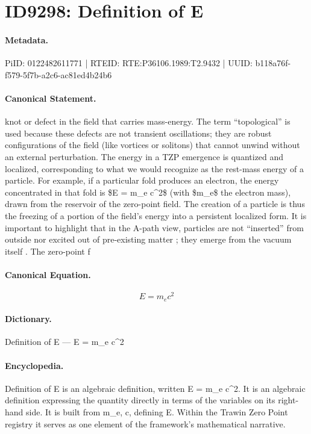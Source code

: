 \section*{ID9298: Definition of E}
\paragraph{Metadata.}
PiID: 0122482611771 | RTEID: RTE:P36106.1989:T2.9432 | UUID: b118a76f-f579-5f7b-a2c6-ac81ed4b24b6

\paragraph{Canonical Statement.}
knot or defect in the field that carries mass-energy. The term “topological” is used because these defects are not transient oscillations; they are robust configurations of the field (like vortices or solitons) that cannot unwind without an external perturbation. The energy in a TZP emergence is quantized and localized, corresponding to what we would recognize as the rest-mass energy of a particle. For example, if a particular fold produces an electron, the energy concentrated in that fold is \$E = m\_e c\textasciicircum{}2\$ (with \$m\_e\$ the electron mass), drawn from the reservoir of the zero-point field. The creation of a particle is thus the freezing of a portion of the field’s energy into a persistent localized form. It is important to highlight that in the A-path view, particles are not “inserted” from outside nor excited out of pre-existing matter ; they emerge from the vacuum itself . The zero-point f

\paragraph{Canonical Equation.}
\[
E = m_e c^2
\]

\paragraph{Dictionary.}
Definition of E — E = m\_e c\textasciicircum{}2

\paragraph{Encyclopedia.}
Definition of E is an algebraic definition, written E = m\_e c\textasciicircum{}2. It is an algebraic definition expressing the quantity directly in terms of the variables on its right-hand side. It is built from m\_e, c, defining E. Within the Trawin Zero Point registry it serves as one element of the framework's mathematical narrative.
